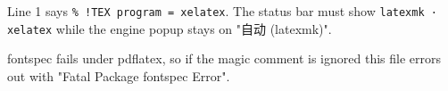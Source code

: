 \documentclass{article}
\begin{document}
Line 1 says \verb|% !TEX program = xelatex|. The status bar must show
\texttt{latexmk · xelatex} while the engine popup stays on "自动 (latexmk)".

fontspec fails under pdflatex, so if the magic comment is ignored this file
errors out with "Fatal Package fontspec Error".
\end{document}
